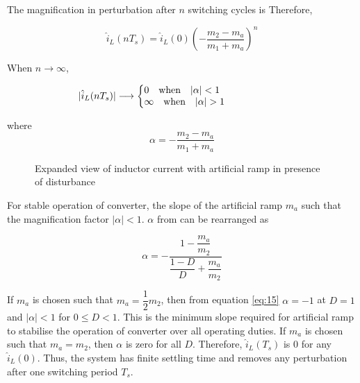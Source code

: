 \documentclass[a4paper]{IEEEtran}
\begin{document}
	The magnification in perturbation after $n$ switching cycles is
	Therefore,

	\begin{equation}
		\hat{i}_L(nT_s) = \hat{i}_L(0)\left(-\dfrac{m_2-m_a}{m_1+m_a} \right)^n
		\label{eq:13}
	\end{equation}

	When $n\longrightarrow \infty$,

	\begin{align}
		|\hat{i}_L(nT_s)| \longrightarrow \left\{ 
		\parbox[]{2in}
		{$0 \quad \text{when} \quad |\alpha| < 1 $\\
		$\infty \quad \text{when} \quad |\alpha| > 1$}
		\right.
		\label{eq:14}
	\end{align}

	where $$ \alpha = -\dfrac{m_2-m_a}{m_1+m_a} $$

	\begin{figure}
		\centering
		
		\caption{Expanded view of inductor current with artificial ramp in presence of disturbance}
		\label{fig:23}
	\end{figure}

	For stable operation of converter, the slope of the artificial ramp $m_a$ such that the magnification factor $|\alpha| < 1$. $\alpha$ from can be rearranged as

	\begin{equation}
		\alpha = -\dfrac{1-\dfrac{m_a}{m_2}}{\dfrac{1-D}{D}+\dfrac{m_a}{m_2}}
		\label{eq:15}
	\end{equation}

	If $m_a$ is chosen such that $m_a = \dfrac{1}{2}m_2$, then from equation \eqref{eq:15} $\alpha = -1$ at $D = 1$ and $|\alpha|<1$ for $0 \leq D < 1$. This is the minimum slope required for artificial ramp to stabilise the operation of converter over all operating duties. If $m_a$ is chosen such that $m_a = m_2$, then $\alpha$ is zero for all $D$. Therefore, $\hat{i}_L(T_s)$ is $0$ for any $\hat{i}_L(0)$. Thus, the system has finite settling time and removes any perturbation after one switching period $T_s$.
\end{document}
